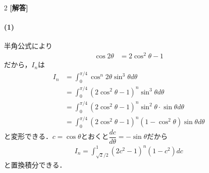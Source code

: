 \documentclass[../../main.tex]{subfiles}
\begin{document}
\setcounter{equation}{0}
\begin{oframed}
  
\end{oframed}
\setlength{\columnseprule}{0.4pt}
\begin{multicols}{2}
  {\bf [解答]}
  \paragraph{(1)}
  半角公式により
  \begin{align}
    \cos 2\theta & = 2\cos^2\theta - 1
  \end{align}
  だから，$I_n$は
  \begin{align}
    I_n
    & = \int_0^{\pi/4} \cos^{n}2\theta \sin^3\theta d\theta                                              \\
    & = \int_0^{\pi/4} \left(2\cos^2\theta - 1\right)^{n} \sin^3\theta d\theta                           \\
    & = \int_0^{\pi/4} \left(2\cos^2\theta - 1\right)^{n} \sin^2\theta \cdot \sin\theta d\theta          \\
    & = \int_0^{\pi/4} \left(2\cos^2\theta - 1\right)^{n} \left(1-\cos^2\theta\right) \sin\theta d\theta
  \end{align}
  と変形できる．$c = \cos\theta$とおくと$\dfrac{dc}{d\theta} = - \sin\theta$だから
  \begin{align}
    I_n = \int_{\sqrt{2}/2}^{1} \left(2c^2 - 1\right)^{n} \left(1-c^2\right) dc
  \end{align}
  と置換積分できる．


\end{multicols}
\end{document}
